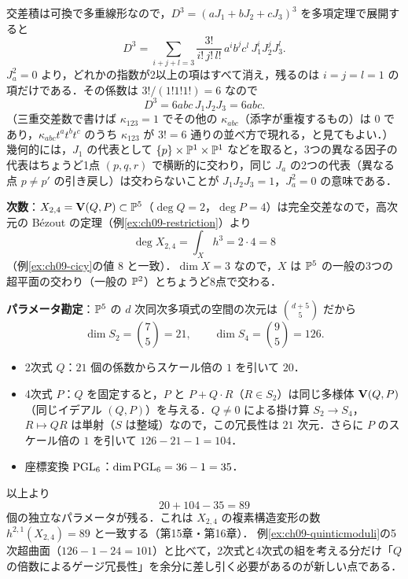 交差積は可換で多重線形なので，$D^3=(aJ_1+bJ_2+cJ_3)^3$ を多項定理で展開すると
\[
  D^3=\sum_{i+j+l=3}\frac{3!}{i!\,j!\,l!}\,a^ib^jc^l\,J_1^iJ_2^jJ_3^l .
\]
$J_a^2=0$ より，どれかの指数が2以上の項はすべて消え，残るのは $i=j=l=1$ の項だけである．その係数は $3!/(1!1!1!)=6$ なので
\[
  D^3=6abc\,J_1J_2J_3=6abc .
\]
（三重交差数で書けば $\kappa_{123}=1$ でその他の $\kappa_{abc}$（添字が重複するもの）は $0$ であり，$\kappa_{abc}t^at^bt^c$ のうち $\kappa_{123}$ が $3!=6$ 通りの並べ方で現れる，と見てもよい．）
幾何的には，$J_1$ の代表として $\{p\}\times\mathbb{P}^1\times\mathbb{P}^1$ などを取ると，3つの異なる因子の代表はちょうど1点 $(p,q,r)$ で横断的に交わり，同じ $J_a$ の2つの代表（異なる点 $p\neq p'$ の引き戻し）は交わらないことが $J_1J_2J_3=1$，$J_a^2=0$ の意味である．

\textbf{次数}：$X_{2,4}=\mathbf{V}(Q,P)\subset\mathbb{P}^5$（$\deg Q=2$，$\deg P=4$）は完全交差なので，高次元の B\'ezout の定理（例\ref{ex:ch09-restriction}）より
\[
  \deg X_{2,4}=\int_{X}h^3=2\cdot4=8
\]
（例\ref{ex:ch09-cicy}の値 $8$ と一致）．$\dim X=3$ なので，$X$ は $\mathbb{P}^5$ の一般の3つの超平面の交わり（一般の $\mathbb{P}^2$）とちょうど8点で交わる．

\textbf{パラメータ勘定}：$\mathbb{P}^5$ の $d$ 次同次多項式の空間の次元は $\binom{d+5}{5}$ だから
\[
  \dim S_2=\binom{7}{5}=21,\qquad \dim S_4=\binom{9}{5}=126 .
\]
\begin{itemize}
  \item 2次式 $Q$：$21$ 個の係数からスケール倍の $1$ を引いて $20$．
  \item 4次式 $P$：$Q$ を固定すると，$P$ と $P+Q\cdot R$（$R\in S_2$）は同じ多様体 $\mathbf{V}(Q,P)$（同じイデアル $(Q,P)$）を与える．$Q\neq0$ による掛け算 $S_2\to S_4$，$R\mapsto QR$ は単射（$S$ は整域）なので，この冗長性は $21$ 次元．さらに $P$ のスケール倍の $1$ を引いて $126-21-1=104$．
  \item 座標変換 $\operatorname{PGL}_6$：$\dim\operatorname{PGL}_6=36-1=35$．
\end{itemize}
以上より
\[
  20+104-35=89
\]
個の独立なパラメータが残る．これは $X_{2,4}$ の複素構造変形の数 $h^{2,1}(X_{2,4})=89$ と一致する（第15章・第16章）．
例\ref{ex:ch09-quinticmoduli}の5次超曲面（$126-1-24=101$）と比べて，2次式と4次式の組を考える分だけ「$Q$ の倍数によるゲージ冗長性」を余分に差し引く必要があるのが新しい点である．
